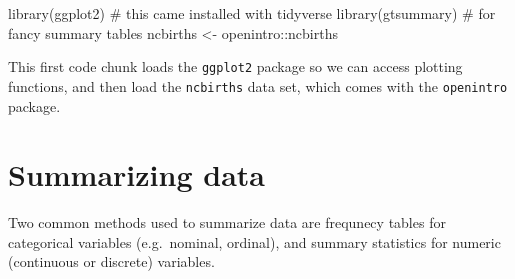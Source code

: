 \documentclass[
  letterpaper,
  DIV=11,
  numbers=noendperiod,
  oneside]{scrreprt}
\newenvironment{Shaded}{\begin{snugshade}}{\end{snugshade}}
\newcommand{\CommentTok}[1]{\textcolor[rgb]{0.37,0.37,0.37}{#1}}
\newcommand{\FunctionTok}[1]{\textcolor[rgb]{0.28,0.35,0.67}{#1}}
\newcommand{\NormalTok}[1]{\textcolor[rgb]{0.00,0.23,0.31}{#1}}
\newcommand{\OtherTok}[1]{\textcolor[rgb]{0.00,0.23,0.31}{#1}}
\newcommand{\SpecialCharTok}[1]{\textcolor[rgb]{0.37,0.37,0.37}{#1}}
\begin{document}
\begin{Shaded}
\begin{Highlighting}[]
\FunctionTok{library}\NormalTok{(ggplot2)                    }\CommentTok{\# this came installed with tidyverse}
\FunctionTok{library}\NormalTok{(gtsummary)                  }\CommentTok{\# for fancy summary tables}
\NormalTok{ncbirths }\OtherTok{\textless{}{-}}\NormalTok{ openintro}\SpecialCharTok{::}\NormalTok{ncbirths }
\end{Highlighting}
\end{Shaded}

{}

This first code chunk loads the \texttt{ggplot2} package so we can
access plotting functions, and then load the \texttt{ncbirths} data set,
which comes with the \texttt{openintro} package.

\section{Summarizing data}\label{summarizing-data}

Two common methods used to summarize data are frequnecy tables for
categorical variables (e.g.~nominal, ordinal), and summary statistics
for numeric (continuous or discrete) variables.
\end{document}
